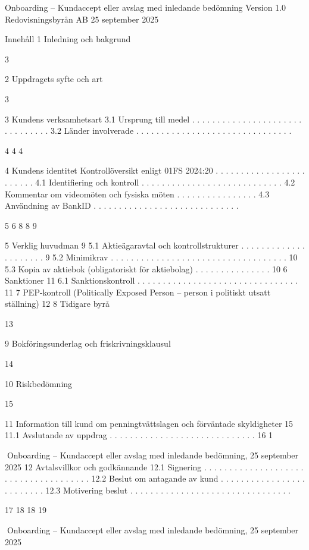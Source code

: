 Onboarding – Kundaccept eller avslag med inledande
bedömning
Version 1.0
Redovisningsbyrån AB
25 september 2025

Innehåll
1 Inledning och bakgrund

3

2 Uppdragets syfte och art

3

3 Kundens verksamhetsart
3.1 Ursprung till medel . . . . . . . . . . . . . . . . . . . . . . . . . . . . . . .
3.2 Länder involverade . . . . . . . . . . . . . . . . . . . . . . . . . . . . . . .

4
4
4

4 Kundens identitet
Kontrollöversikt enligt 01FS 2024:20 . . . . . . . . . . . . . . . . . . . . . . . .
4.1 Identifiering och kontroll . . . . . . . . . . . . . . . . . . . . . . . . . . . .
4.2 Kommentar om videomöten och fysiska möten . . . . . . . . . . . . . . . .
4.3 Användning av BankID . . . . . . . . . . . . . . . . . . . . . . . . . . . . .

5
6
8
8
9

5 Verklig huvudman
9
5.1 Aktieägaravtal och kontrollstrukturer . . . . . . . . . . . . . . . . . . . . . 9
5.2 Minimikrav . . . . . . . . . . . . . . . . . . . . . . . . . . . . . . . . . . . 10
5.3 Kopia av aktiebok (obligatoriskt för aktiebolag) . . . . . . . . . . . . . . . 10
6 Sanktioner
11
6.1 Sanktionskontroll . . . . . . . . . . . . . . . . . . . . . . . . . . . . . . . . 11
7 PEP-kontroll (Politically Exposed Person – person i politiskt utsatt
ställning)
12
8 Tidigare byrå

13

9 Bokföringsunderlag och friskrivningsklausul

14

10 Riskbedömning

15

11 Information till kund om penningtvättslagen och förväntade skyldigheter
15
11.1 Avslutande av uppdrag . . . . . . . . . . . . . . . . . . . . . . . . . . . . . 16
1

Onboarding – Kundaccept eller avslag med inledande bedömning,
25 september 2025
12 Avtalsvillkor och godkännande
12.1 Signering . . . . . . . . . . . . . . . . . . . . . . . . . . . . . . . . . . . . .
12.2 Beslut om antagande av kund . . . . . . . . . . . . . . . . . . . . . . . . .
12.3 Motivering beslut . . . . . . . . . . . . . . . . . . . . . . . . . . . . . . . .

17
18
18
19

Onboarding – Kundaccept eller avslag med inledande bedömning,
25 september 2025

